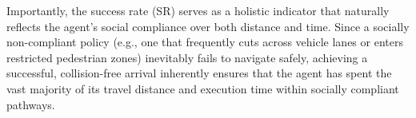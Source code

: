 Importantly, the success rate (SR) serves as a holistic indicator that naturally reflects the agent's social compliance over both distance and time. Since a socially non-compliant policy (e.g., one that frequently cuts across vehicle lanes or enters restricted pedestrian zones) inevitably fails to navigate safely, achieving a successful, collision-free arrival inherently ensures that the agent has spent the vast majority of its travel distance and execution time within socially compliant pathways.

